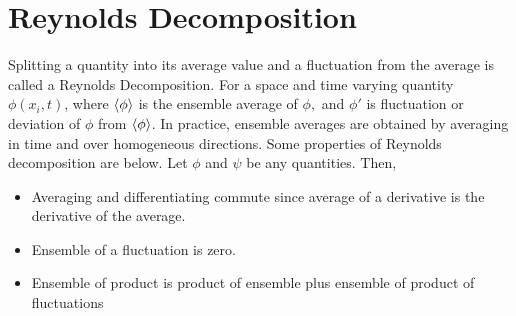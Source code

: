 \section{Reynolds Decomposition}
Splitting a quantity into its average value and a fluctuation from the average is called a Reynolds Decomposition. For a space and time varying quantity $\phi(x_i,t)$,
where $\expval{\phi}$ is the ensemble average of $\phi,$ and $\phi'$ is fluctuation or deviation of $\phi$ from $\expval{\phi}$. In practice, ensemble averages are obtained by averaging in time and over homogeneous directions.
Some properties of Reynolds decomposition are below. Let $\phi$ and $\psi$ be any quantities. Then,
\begin{itemize}
    \item Averaging and differentiating commute since average of a derivative is the derivative of the average.
    \item Ensemble of a fluctuation is zero.
    \item Ensemble of product is product of ensemble plus ensemble of product of fluctuations
\end{itemize}


